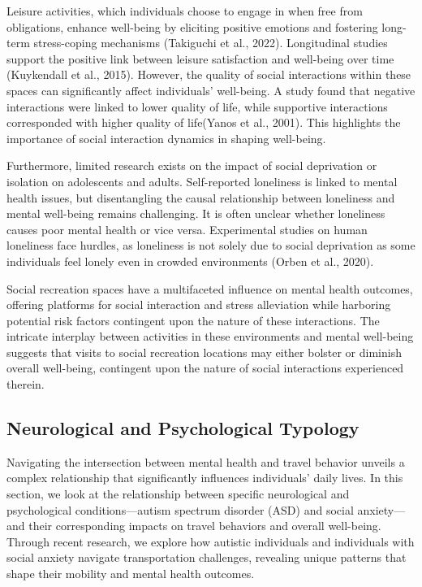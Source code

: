 \documentclass[
  letterpaper,
  number,
  review,
  3p]{elsarticle}
\begin{document}
Leisure activities, which individuals choose to engage in when free from
obligations, enhance well-being by eliciting positive emotions and
fostering long-term stress-coping mechanisms (Takiguchi et al., 2022).
Longitudinal studies support the positive link between leisure
satisfaction and well-being over time (Kuykendall et al., 2015).
However, the quality of social interactions within these spaces can
significantly affect individuals' well-being. A study found that
negative interactions were linked to lower quality of life, while
supportive interactions corresponded with higher quality of life(Yanos
et al., 2001). This highlights the importance of social interaction
dynamics in shaping well-being.

Furthermore, limited research exists on the impact of social deprivation
or isolation on adolescents and adults. Self-reported loneliness is
linked to mental health issues, but disentangling the causal
relationship between loneliness and mental well-being remains
challenging. It is often unclear whether loneliness causes poor mental
health or vice versa. Experimental studies on human loneliness face
hurdles, as loneliness is not solely due to social deprivation as some
individuals feel lonely even in crowded environments (Orben et al.,
2020).

Social recreation spaces have a multifaceted influence on mental health
outcomes, offering platforms for social interaction and stress
alleviation while harboring potential risk factors contingent upon the
nature of these interactions. The intricate interplay between activities
in these environments and mental well-being suggests that visits to
social recreation locations may either bolster or diminish overall
well-being, contingent upon the nature of social interactions
experienced therein.

\subsection{Neurological and Psychological
Typology}\label{neurological-and-psychological-typology}

Navigating the intersection between mental health and travel behavior
unveils a complex relationship that significantly influences
individuals' daily lives. In this section, we look at the relationship
between specific neurological and psychological conditions---autism
spectrum disorder (ASD) and social anxiety---and their corresponding
impacts on travel behaviors and overall well-being. Through recent
research, we explore how autistic individuals and individuals with
social anxiety navigate transportation challenges, revealing unique
patterns that shape their mobility and mental health outcomes.
\end{document}
